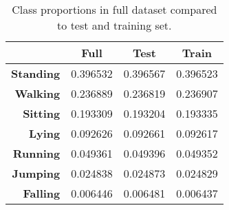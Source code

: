 \begin{table}[!htbp]
\footnotesize
\captionsetup{font=scriptsize, justification=centering}
\centering
\begin{tabular}{r|c|c|c|}
\cline{2-4}
 & \textbf{Full} & \textbf{Test} & \textbf{Train} \\ \hline
\multicolumn{1}{|r|}{\textbf{Standing}} & 0.396532 & 0.396567 & 0.396523 \\ \hline
\multicolumn{1}{|r|}{\textbf{Walking}} & 0.236889 & 0.236819 & 0.236907 \\ \hline
\multicolumn{1}{|r|}{\textbf{Sitting}} & 0.193309 & 0.193204 & 0.193335 \\ \hline
\multicolumn{1}{|r|}{\textbf{Lying}} & 0.092626 & 0.092661 & 0.092617 \\ \hline
\multicolumn{1}{|r|}{\textbf{Running}} & 0.049361 & 0.049396 & 0.049352 \\ \hline
\multicolumn{1}{|r|}{\textbf{Jumping}} & 0.024838 & 0.024873 & 0.024829 \\ \hline
\multicolumn{1}{|r|}{\textbf{Falling}} & 0.006446 & 0.006481 & 0.006437 \\ \hline
\end{tabular}
\caption{Class proportions in full dataset compared to test and training set.}
\label{test_train_prop_table}
\end{table}

